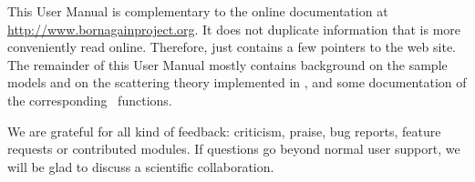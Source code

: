 This User Manual is complementary to the online documentation
at \url{http://www.bornagainproject.org}.
It does not duplicate information that is more conveniently read online.
Therefore,  just contains a few pointers to the web site.
The remainder of this User Manual mostly contains background
on the sample models and on the scattering theory implemented in \BornAgain,
and some documentation of the corresponding \Python\ functions.


\noindent
{}
We are grateful for all kind of feedback:
criticism, praise, bug reports, feature requests or contributed modules.
If questions go beyond normal user support,
we will be glad to discuss a scientific collaboration.
